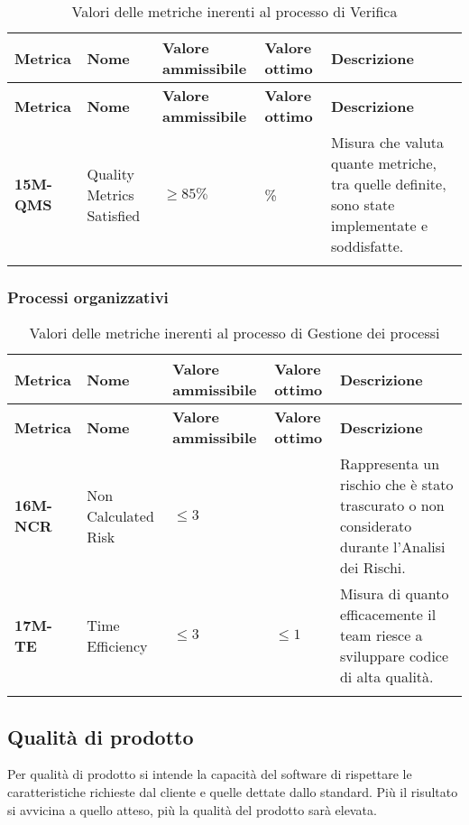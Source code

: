 \begin{longtable}{|>{\centering\arraybackslash}p{}|>{\centering\arraybackslash}p{}|>{\centering\arraybackslash}p{}|>{\centering\arraybackslash}p{}|>{\centering\arraybackslash}p{}|}
    \hline
    \textbf{Metrica} & \textbf{Nome} & \textbf{Valore ammissibile} & \textbf{Valore ottimo}& \textbf{Descrizione}\\
	\hline
    \endfirsthead
    \hline
    \textbf{Metrica} & \textbf{Nome} & \textbf{Valore ammissibile} & \textbf{Valore ottimo}& \textbf{Descrizione}\\
    \endhead
	\textbf{15M-QMS} & Quality Metrics Satisfied & $\geq 85\% $ & 100\% & Misura che valuta quante metriche, tra quelle definite, sono state implementate e soddisfatte.\\
	\hline
	\caption{ Valori delle metriche inerenti al processo di Verifica}
	\label{table:5}
\end{longtable}
\subsubsection{Processi organizzativi}
\begin{longtable}{|>{\centering\arraybackslash}p{}|>{\centering\arraybackslash}p{}|>{\centering\arraybackslash}p{}|>{\centering\arraybackslash}p{}|>{\centering\arraybackslash}p{}|}
    \hline
    \textbf{Metrica} & \textbf{Nome} & \textbf{Valore ammissibile} & \textbf{Valore ottimo}& \textbf{Descrizione}\\
	\hline
    \endfirsthead
    \hline
    \textbf{Metrica} & \textbf{Nome} & \textbf{Valore ammissibile} & \textbf{Valore ottimo}& \textbf{Descrizione}\\
    \endhead
	\hline
	\textbf{16M-NCR} & Non Calculated Risk & $\leq 3 $ & 0 & Rappresenta un rischio che è stato trascurato o non considerato durante l’Analisi dei Rischi.\\
	\hline
	\textbf{17M-TE} & Time Efficiency & $\leq 3 $ & $\leq 1 $ & Misura di quanto efficacemente il team riesce a sviluppare codice di alta qualità.\\
	\hline

	\caption{ Valori delle metriche inerenti al processo di Gestione dei processi}
	\label{table:6}
\end{longtable}
\subsection{Qualità di prodotto}
Per qualità di prodotto si intende la capacità del software di rispettare 
le caratteristiche richieste dal cliente e quelle dettate dallo standard.
Più il risultato si avvicina a quello atteso, più la qualità del prodotto
sarà elevata. 

